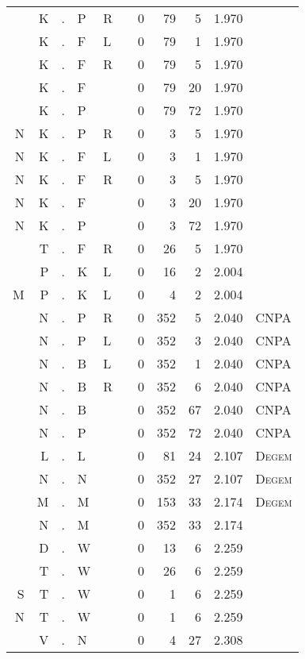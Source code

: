 \begin{longtable}{r@{ } r@{ } c@{ } l@{ } l@{ } l@{ } r r r r l }
  & K & . & P & R &   & 0 & 79 & 5 & 1.970 &  \\
  & K & . & F & L &   & 0 & 79 & 1 & 1.970 &  \\
  & K & . & F & R &   & 0 & 79 & 5 & 1.970 &  \\
  & K & . & F &   &   & 0 & 79 & 20 & 1.970 &  \\
  & K & . & P &   &   & 0 & 79 & 72 & 1.970 &  \\
N & K & . & P & R &   & 0 & 3 & 5 & 1.970 &  \\
N & K & . & F & L &   & 0 & 3 & 1 & 1.970 &  \\
N & K & . & F & R &   & 0 & 3 & 5 & 1.970 &  \\
N & K & . & F &   &   & 0 & 3 & 20 & 1.970 &  \\
N & K & . & P &   &   & 0 & 3 & 72 & 1.970 &  \\
  & T & . & F & R &   & 0 & 26 & 5 & 1.970 &  \\
  & P & . & K & L &   & 0 & 16 & 2 & 2.004 &  \\
M & P & . & K & L &   & 0 & 4 & 2 & 2.004 &  \\
  & N & . & P & R &   & 0 & 352 & 5 & 2.040 & \textsc{CNPA} \\
  & N & . & P & L &   & 0 & 352 & 3 & 2.040 & \textsc{CNPA} \\
  & N & . & B & L &   & 0 & 352 & 1 & 2.040 & \textsc{CNPA} \\
  & N & . & B & R &   & 0 & 352 & 6 & 2.040 & \textsc{CNPA} \\
  & N & . & B &   &   & 0 & 352 & 67 & 2.040 & \textsc{CNPA} \\
  & N & . & P &   &   & 0 & 352 & 72 & 2.040 & \textsc{CNPA} \\
  & L & . & L &   &   & 0 & 81 & 24 & 2.107 & \textsc{Degem} \\
  & N & . & N &   &   & 0 & 352 & 27 & 2.107 & \textsc{Degem} \\
  & M & . & M &   &   & 0 & 153 & 33 & 2.174 & \textsc{Degem} \\
  & N & . & M &   &   & 0 & 352 & 33 & 2.174 &  \\
  & D & . & W &   &   & 0 & 13 & 6 & 2.259 &  \\
  & T & . & W &   &   & 0 & 26 & 6 & 2.259 &  \\
S & T & . & W &   &   & 0 & 1 & 6 & 2.259 &  \\
N & T & . & W &   &   & 0 & 1 & 6 & 2.259 &  \\
  & V & . & N &   &   & 0 & 4 & 27 & 2.308 &  \\

\end{longtable}
